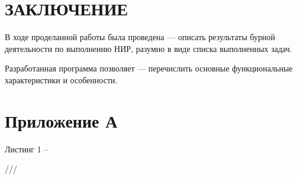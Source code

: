 \documentclass[a4paper,12pt]{article}
\begin{document}


\section*{\centering ЗАКЛЮЧЕНИЕ}

В ходе проделанной работы была проведена --- описать результаты бурной деятельности по выполнению НИР, разумно в виде списка выполненных задач.

Разработанная программа позволяет --- перечислить основные функциональные характеристики и особенности.

\pagebreak

\printbibliography

\pagebreak

\section*{ \centering Приложение А} 

\begin{center}
Листинг 1 -- 
\end{center}


\begin{MyCode}
///
\end{MyCode}
\end{document}
